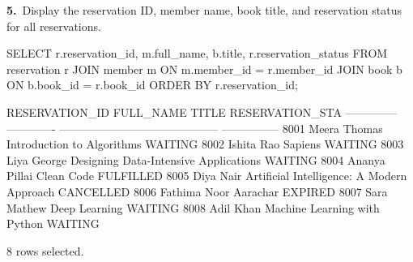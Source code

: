 \noindent\begin{minipage}{\linewidth}
\begingroup{}
{\fontsize{14}{17}\selectfont\textbf{5.}}\ Display the reservation ID, member name, book title, and reservation status for all reservations.\par
\endgroup\vspace{12pt}


\begin{sqlcode}
SELECT r.reservation_id, m.full_name, b.title, r.reservation_status
FROM reservation r
JOIN member m ON m.member_id = r.member_id
JOIN book b ON b.book_id = r.book_id
ORDER BY r.reservation_id;
\end{sqlcode}

\vspace{18pt}


\begin{sqlout}[fontsize=\footnotesize]
RESERVATION_ID  FULL_NAME      TITLE                                       RESERVATION_STA
--------------  -------------  ------------------------------------------  ---------------
          8001  Meera Thomas   Introduction to Algorithms                  WAITING
          8002  Ishita Rao     Sapiens                                     WAITING
          8003  Liya George    Designing Data-Intensive Applications       WAITING
          8004  Ananya Pillai  Clean Code                                  FULFILLED
          8005  Diya Nair      Artificial Intelligence: A Modern Approach  CANCELLED
          8006  Fathima Noor   Aarachar                                    EXPIRED
          8007  Sara Mathew    Deep Learning                               WAITING
          8008  Adil Khan      Machine Learning with Python                WAITING

8 rows selected.
\end{sqlout}
\end{minipage}\par\vspace{24pt}

